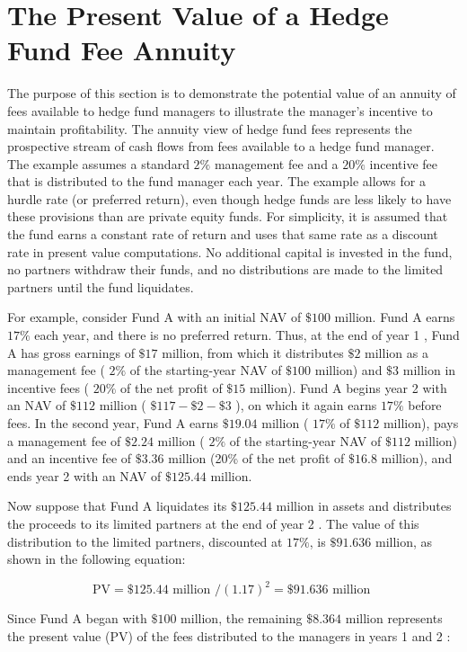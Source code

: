 \documentclass[11pt]{article}
\begin{document}
\section*{The Present Value of a Hedge Fund Fee Annuity}
The purpose of this section is to demonstrate the potential value of an annuity of fees available to hedge fund managers to illustrate the manager's incentive to maintain profitability. The annuity view of hedge fund fees represents the prospective stream of cash flows from fees available to a hedge fund manager. The example assumes a standard $2 \%$ management fee and a $20 \%$ incentive fee that is distributed to the fund manager each year. The example allows for a hurdle rate (or preferred return), even though hedge funds are less likely to have these provisions than are private equity funds. For simplicity, it is assumed that the fund earns a constant rate of return and uses that same rate as a discount rate in present value computations. No additional capital is invested in the fund, no partners withdraw their funds, and no distributions are made to the limited partners until the fund liquidates.

For example, consider Fund A with an initial NAV of $\$ 100$ million. Fund A earns $17 \%$ each year, and there is no preferred return. Thus, at the end of year 1 , Fund A has gross earnings of $\$ 17$ million, from which it distributes $\$ 2$ million as a management fee ( $2 \%$ of the starting-year NAV of $\$ 100$ million) and $\$ 3$ million in incentive fees ( $20 \%$ of the net profit of $\$ 15$ million). Fund A begins year 2 with an NAV of $\$ 112$ million ( $\$ 117-\$ 2-\$ 3$ ), on which it again earns $17 \%$ before fees. In the second year, Fund A earns $\$ 19.04$ million ( $17 \%$ of $\$ 112$ million), pays a management fee of $\$ 2.24$ million ( $2 \%$ of the starting-year NAV of $\$ 112$ million) and an incentive fee of $\$ 3.36$ million (20\% of the net profit of $\$ 16.8$ million), and ends year 2 with an NAV of $\$ 125.44$ million.

Now suppose that Fund A liquidates its $\$ 125.44$ million in assets and distributes the proceeds to its limited partners at the end of year 2 . The value of this distribution to the limited partners, discounted at $17 \%$, is $\$ 91.636$ million, as shown in the following equation:

$$
\mathrm{PV}=\$ 125.44 \text { million } /(1.17)^{2}=\$ 91.636 \text { million }
$$

Since Fund A began with $\$ 100$ million, the remaining $\$ 8.364$ million represents the present value (PV) of the fees distributed to the managers in years 1 and 2 :
\end{document}
